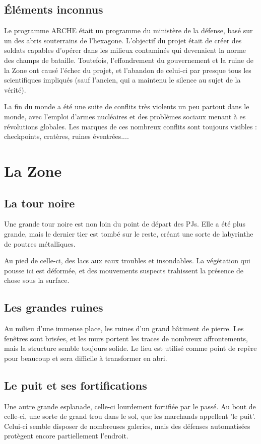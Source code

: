 \documentclass[10pt,a4paper]{article}
\begin{document}
\subsection{Éléments inconnus}
Le programme ARCHE était un programme du ministère de la défense, basé sur un des abris souterrains de l'hexagone. L'objectif du projet était de créer des soldats capables d'opérer dans les milieux contaminés qui devenaient la norme des champs de bataille. Toutefois, l'effondrement du gouvernement et la ruine de la Zone ont causé l'échec du projet, et l'abandon de celui-ci par presque tous les scientifiques impliqués (sauf l'ancien, qui a maintenu le silence au sujet de la vérité).

La fin du monde a été une suite de conflits très violents un peu partout dans le monde, avec l'emploi d'armes nucléaires et des problèmes sociaux menant à es révolutions globales. Les marques de ces nombreux conflits sont toujours visibles : checkpoints, cratères, ruines éventrées....
\section{La Zone}
\subsection{La tour noire}
Une grande tour noire est non loin du point de départ des PJs. Elle a été plus grande, mais le dernier tier est tombé sur le reste, créant une sorte de labyrinthe de poutres métalliques.

Au pied de celle-ci, des lacs aux eaux troubles et insondables. La végétation qui pousse ici est déformée, et des mouvements suspects trahissent la présence de chose sous la surface.
\subsection{Les grandes ruines}
Au milieu d'une immense place, les ruines d'un grand bâtiment de pierre. Les fenêtres sont brisées, et les murs portent les traces de nombreux affrontements, mais la structure semble toujours solide. Le lieu est utilisé comme point de repère pour beaucoup et sera difficile à transformer en abri.
\subsection{Le puit et ses fortifications}
Une autre grande esplanade, celle-ci lourdement fortifiée par le passé. Au bout de celle-ci, une sorte de grand trou dans le sol, que les marchands appellent 'le puit'. Celui-ci semble disposer de nombreuses galeries, mais des défenses automatisées protègent encore partiellement l'endroit.
\end{document}
